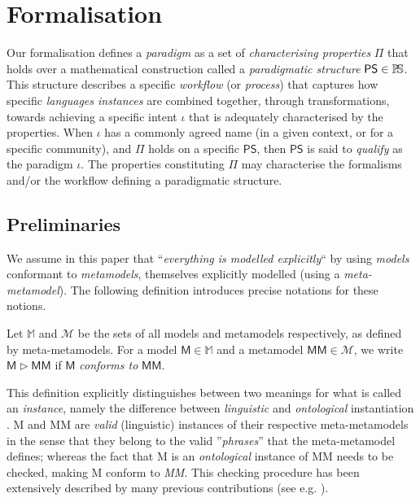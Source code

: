 \section{Formalisation}
\label{sec:Formalisation}

Our formalisation defines a \emph{paradigm} as a set of 
\emph{characterising properties} $\mathsf{\Pi}$ that holds over a mathematical 
construction called a \emph{paradigmatic structure} $\mathsf{PS}\in \mathbb{P}\!\mathbb{S}$. 
This structure describes a specific \emph{workflow} (or \emph{process}) that 
captures how specific \emph{languages instances} are combined together, 
through transformations, towards achieving a specific intent $\iota$ that is 
adequately characterised by the properties. When $\iota$ has a commonly agreed 
name (in a given context, or for a specific community), and $\mathsf{\Pi}$ holds 
on a specific $\mathsf{PS}$, then $\mathsf{PS}$ is said to \emph{qualify} as 
the paradigm $\iota$. The properties constituting $\mathsf{\Pi}$ may 
characterise the formalisms and/or the workflow defining a paradigmatic 
structure. 

\subsection{Preliminaries}
\label{sec:Formalisation-Preliminaries}

We assume in this paper that ``\emph{everything is modelled explicitly}`` by 
using \emph{models} conformant to \emph{metamodels}, themselves explicitly 
modelled (using a \emph{meta-metamodel}). The following definition introduces 
precise notations for these notions.

\begin{Definition}
   Let $\mathbb{M}$ and $\mathcal{M}$ be the sets of all models and metamodels 
respectively, as defined by meta-metamodels. For a model $\mathsf{M} \in 
\mathbb{M}$ and a metamodel $\mathsf{MM} \in \mathcal{M}$, we write $\mathsf{M} 
\rhd \mathsf{MM}$ if $\mathsf{M}$ \emph{conforms to} $\mathsf{MM}$.
\end{Definition}
This definition explicitly distinguishes between two meanings for what is 
called an \emph{instance}, namely the difference between \emph{linguistic} and 
\emph{ontological} instantiation \cite{J:Kuhne:2006}. \textsf{M} and \textsf{MM} 
are \emph{valid} (linguistic) instances of their respective meta-metamodels in 
the sense that they belong to the valid ''\emph{phrases}'' that the 
meta-metamodel defines; whereas the fact that \textsf{M} is an 
\emph{ontological} instance of \textsf{MM} needs to be checked, making 
\textsf{M} conform to \emph{MM}. This checking procedure has been extensively 
described by many previous contributions (see e.g. \cite{PhD:Amrani:2013}).

